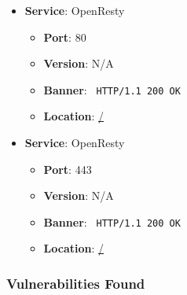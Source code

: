\documentclass{article}
\begin{document}
\begin{itemize}
    
        \item \textbf{Service}: OpenResty
        \begin{itemize}
            \item \textbf{Port}: 80
            \item \textbf{Version}:  N/A 
            \item \textbf{Banner}: \texttt{
                HTTP/1.1 200 OK
            }
            \item \textbf{Location}: \href{ / }{ / }
        \end{itemize}
    
        \item \textbf{Service}: OpenResty
        \begin{itemize}
            \item \textbf{Port}: 443
            \item \textbf{Version}:  N/A 
            \item \textbf{Banner}: \texttt{
                HTTP/1.1 200 OK
            }
            \item \textbf{Location}: \href{ / }{ / }
        \end{itemize}
    
\end{itemize}


\subsubsection*{Vulnerabilities Found}
\end{document}
